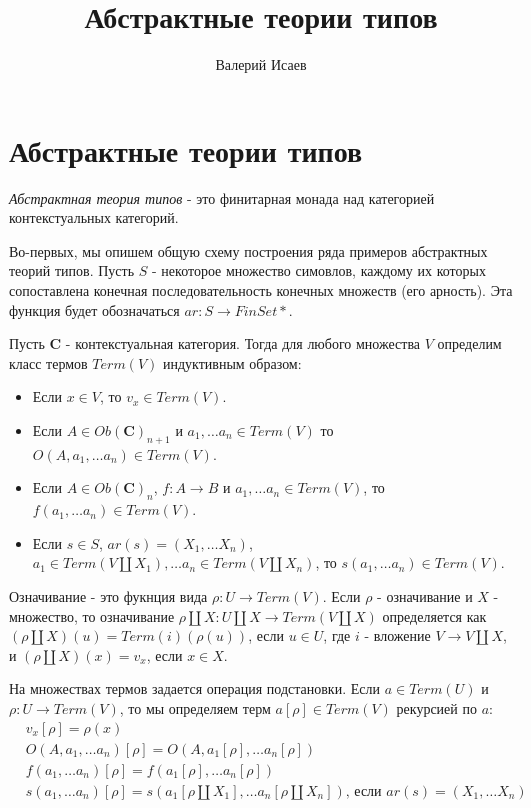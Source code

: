 \documentclass{amsart}
\theoremstyle{definition}
\theoremstyle{remark}
\newcommand{\cat}[1]{\mathbf{#1}}
\renewcommand{\C}{\cat{C}}
\numberwithin{figure}{section}
\begin{document}
\title{Абстрактные теории типов}

\author{Валерий Исаев}


\maketitle

\section{Абстрактные теории типов}

\begin{defn}
\emph{Абстрактная теория типов} - это финитарная монада над категорией контекстуальных категорий.
\end{defn}

Во-первых, мы опишем общую схему построения ряда примеров абстрактных теорий типов.
Пусть $S$ - некоторое множество симовлов, каждому их которых сопоставлена конечная последовательность конечных множеств (его арность).
Эта функция будет обозначаться $ar : S \to FinSet*$.

Пусть $\C$ - контекстуальная категория.
Тогда для любого множества $V$ определим класс термов $Term(V)$ индуктивным образом:
\begin{itemize}
\item Если $x \in V$, то $v_x \in Term(V)$.
\item Если $A \in Ob(\C)_{n + 1}$ и $a_1, \ldots a_n \in Term(V)$ то $O(A, a_1, \ldots a_n) \in Term(V)$.
\item Если $A \in Ob(\C)_n$, $f : A \to B$ и $a_1, \ldots a_n \in Term(V)$, то $f(a_1, \ldots a_n) \in Term(V)$.
\item Если $s \in S$, $ar(s) = (X_1, \ldots X_n)$, $a_1 \in Term(V \amalg X_1), \ldots a_n \in Term(V \amalg X_n)$, то $s(a_1, \ldots a_n) \in Term(V)$.
\end{itemize}

Означивание - это фукнция вида $\rho : U \to Term(V)$.
Если $\rho$ - означивание и $X$ - множество, то означивание $\rho \amalg X : U \amalg X \to Term(V \amalg X)$ определяется как $(\rho \amalg X)(u) = Term(i)(\rho(u))$, если $u \in U$, где $i$ - вложение $V \to V \amalg X$, и $(\rho \amalg X)(x) = v_x$, если $x \in X$.

На множествах термов задается операция подстановки.
Если $a \in Term(U)$ и $\rho : U \to Term(V)$, то мы определяем терм $a[\rho] \in Term(V)$ рекурсией по $a$:
\begin{align*}
& v_x[\rho] = \rho(x) \\
& O(A, a_1, \ldots a_n)[\rho] = O(A, a_1[\rho], \ldots a_n[\rho]) \\
& f(a_1, \ldots a_n)[\rho] = f(a_1[\rho], \ldots a_n[\rho]) \\
& s(a_1, \ldots a_n)[\rho] = s(a_1[\rho \amalg X_1], \ldots a_n[\rho \amalg X_n]) \text{, если } ar(s) = (X_1, \ldots X_n)
\end{align*}
\end{document}

